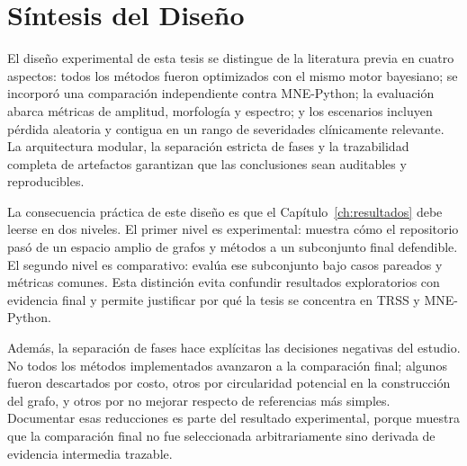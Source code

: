 \section{Síntesis del Diseño}

El diseño experimental de esta tesis se distingue de la literatura previa en cuatro aspectos: todos los métodos fueron optimizados con el mismo motor bayesiano; se incorporó una comparación independiente contra MNE-Python; la evaluación abarca métricas de amplitud, morfología y espectro; y los escenarios incluyen pérdida aleatoria y contigua en un rango de severidades clínicamente relevante. La arquitectura modular, la separación estricta de fases y la trazabilidad completa de artefactos garantizan que las conclusiones sean auditables y reproducibles.

La consecuencia práctica de este diseño es que el Capítulo~\ref{ch:resultados} debe leerse en dos niveles. El primer nivel es experimental: muestra cómo el repositorio pasó de un espacio amplio de grafos y métodos a un subconjunto final defendible. El segundo nivel es comparativo: evalúa ese subconjunto bajo casos pareados y métricas comunes. Esta distinción evita confundir resultados exploratorios con evidencia final y permite justificar por qué la tesis se concentra en TRSS y MNE-Python.

Además, la separación de fases hace explícitas las decisiones negativas del estudio. No todos los métodos implementados avanzaron a la comparación final; algunos fueron descartados por costo, otros por circularidad potencial en la construcción del grafo, y otros por no mejorar respecto de referencias más simples. Documentar esas reducciones es parte del resultado experimental, porque muestra que la comparación final no fue seleccionada arbitrariamente sino derivada de evidencia intermedia trazable.